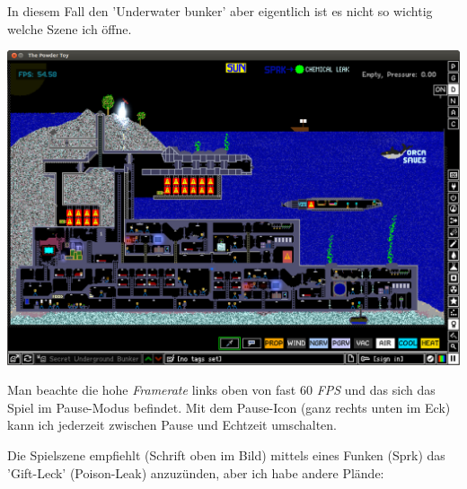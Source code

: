 \begin{multicols}{2}
In diesem Fall den 'Underwater bunker' aber eigentlich ist es nicht so wichtig welche Szene ich öffne.
\begin{center}
\includegraphics[width=\linewidth]{powdertoy/powdertoy-bu1.png}
\end{center}
Man beachte die hohe \textit{Framerate} links oben von fast 60 \textit{FPS} und das sich das Spiel im Pause-Modus befindet. Mit dem Pause-Icon (ganz rechts unten im Eck) kann ich jederzeit zwischen Pause und Echtzeit umschalten.

Die Spielszene empfiehlt (Schrift oben im Bild) mittels eines Funken (Sprk) das 'Gift-Leck' (Poison-Leak) anzuzünden, aber ich habe andere Plände:


\end{multicols}
